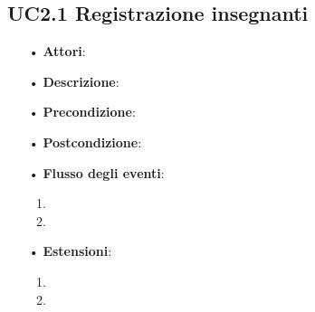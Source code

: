 \subsection{UC2.1 Registrazione insegnanti}
\begin{itemize}
	\item[•] \textbf{Attori}: 
	\item[•] \textbf{Descrizione}:
	\item[•] \textbf{Precondizione}:
	\item[•] \textbf{Postcondizione}:
	\item[•] \textbf{Flusso degli eventi}:
		\begin{enumerate}
			\item
			\item
		\end{enumerate}
	\item[•] \textbf{Estensioni}:
		\begin{enumerate}
			\item
			\item
		\end{enumerate}
\end{itemize}
